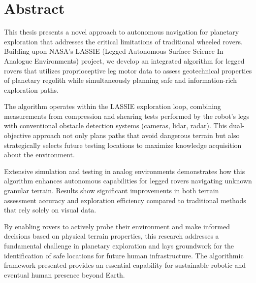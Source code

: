 \chapter*{Abstract}
\label{chap:Abstract}

This thesis presents a novel approach to autonomous navigation for planetary exploration that addresses the critical limitations of traditional wheeled rovers. Building upon NASA's LASSIE (Legged Autonomous Surface Science In Analogue Environments) project, we develop an integrated algorithm for legged rovers that utilizes proprioceptive leg motor data to assess geotechnical properties of planetary regolith while simultaneously planning safe and information-rich exploration paths.

The algorithm operates within the LASSIE exploration loop, combining measurements from compression and shearing tests performed by the robot's legs with conventional obstacle detection systems (cameras, lidar, radar). This dual-objective approach not only plans paths that avoid dangerous terrain but also strategically selects future testing locations to maximize knowledge acquisition about the environment.

Extensive simulation and testing in analog environments demonstrates how this algorithm enhances autonomous capabilities for legged rovers navigating unknown granular terrain. Results show significant improvements in both terrain assessment accuracy and exploration efficiency compared to traditional methods that rely solely on visual data.

By enabling rovers to actively probe their environment and make informed decisions based on physical terrain properties, this research addresses a fundamental challenge in planetary exploration and lays groundwork for the identification of safe locations for future human infrastructure. The algorithmic framework presented provides an essential capability for sustainable robotic and eventual human presence beyond Earth.
